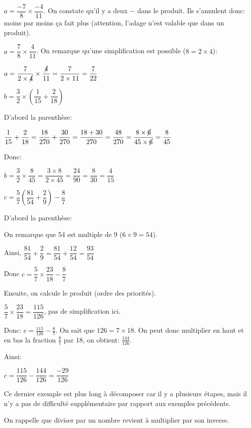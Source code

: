 \documentclass[a4paper,12pt]{scrartcl}
\begin{document}
$a = \dfrac{-7}{8} \times \dfrac{-4}{11}$. On constate qu'il y a deux \og $-$ \fg{} dans le produit. Ils s'annulent donc: \og moins par moins ça fait plus \fg{} (attention, l'adage n'est valable que dans un produit). 

$a = \dfrac{7}{8} \times \dfrac{4}{11}$. On remarque qu'une simplification est possible ($8 = 2 \times 4$):

$a = \dfrac{7}{2 \times \cancel{4}} \times \dfrac{\cancel{4}}{11} = \dfrac{7}{2 \times 11} = \dfrac{7}{22}$

\question{}
$b = \dfrac{3}{2} \times \left( \dfrac{1}{15} + \dfrac{2}{18} \right)$

D'abord la parenthèse:

$\dfrac{1}{15} + \dfrac{2}{18} = \dfrac{18}{270} + \dfrac{30}{270} = \dfrac{18+30}{270} = \dfrac{48}{270} = \dfrac{8 \times \cancel{6}}{45 \times \cancel{6}} = \dfrac{8}{45}$

Donc: 

$b =  \dfrac{3}{2} \times \dfrac{8}{45} = \dfrac{3 \times 8}{2 \times 45} = \dfrac{24}{90} = \dfrac{8}{30} = \dfrac{4}{15}$

\question{}
$c = \dfrac{5}{7} \left( \dfrac{81}{54} + \dfrac{2}{9} \right) - \dfrac{8}{7}$

D'abord la parenthèse:

On remarque que 54 est multiple de 9 ($6 \times 9 = 54$).

Ainsi, $\dfrac{81}{54} + \dfrac{2}{9} = \dfrac{81}{54} + \dfrac{12}{54} = \dfrac{93}{54}$

Donc $c = \dfrac{5}{7} \times \dfrac{23}{18} - \dfrac{8}{7}$

Ensuite, on calcule le produit (ordre des priorités).

$\dfrac{5}{7} \times \dfrac{23}{18} = \dfrac{115}{126}$, pas de simplification ici.

Donc:
$c = \frac{115}{126} - \frac{8}{7}$. On sait que $126 = 7 \times 18$. On peut donc multiplier en haut et en bas la fraction $\frac{8}{7}$ par 18, on obtient: $\frac{144}{126}$.

Ainsi:

$c = \dfrac{115}{126} - \dfrac{144}{126} = \dfrac{-29}{126}$

Ce dernier exemple est plus long à décomposer car il y a plusieurs étapes, mais il n'y a pas de difficulté supplémentaire par rapport aux exemples précédents. 


On rappelle que diviser par un nombre revient à multiplier par son inverse. 
\end{document}
